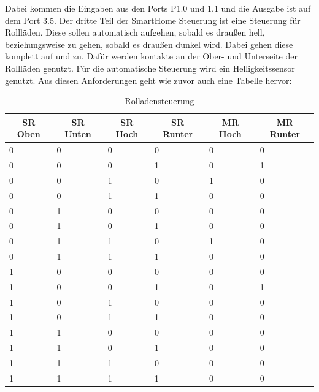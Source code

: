 Dabei kommen die Eingaben aus den Ports P1.0 und 1.1 und die Ausgabe ist auf dem Port 3.5.
Der dritte Teil der SmartHome Steuerung ist eine Steuerung für Rollläden. Diese sollen automatisch aufgehen, sobald es draußen hell, beziehungsweise zu gehen, sobald es draußen dunkel wird. Dabei gehen diese komplett auf und zu. Dafür werden kontakte an der Ober- und Unterseite der Rollläden genutzt. Für die automatische Steuerung wird ein Helligkeitssensor genutzt.
Aus diesen Anforderungen geht wie zuvor auch eine Tabelle hervor:

\begin{table}[]
\centering
\caption{Rolladensteuerung}
\label{my-label}
\begin{tabular}{|l|l|l|l|l|l|}
\hline
\multicolumn{1}{|c|}{\textbf{SR Oben}} & \multicolumn{1}{c|}{\textbf{SR Unten}} & \multicolumn{1}{c|}{\textbf{SR Hoch}} & \multicolumn{1}{c|}{\textbf{SR Runter}} & \multicolumn{1}{c|}{\textbf{MR Hoch}} & \multicolumn{1}{c|}{\textbf{MR Runter}} \\ \hline
 0 & 0 & 0 & 0 & 0 & 0 \\ \hline
 0 & 0 & 0 & 1 & 0 & 1 \\ \hline
 0 & 0 & 1 & 0 & 1 & 0 \\ \hline
 0 & 0 & 1 & 1 & 0 & 0 \\ \hline
 0 & 1 & 0 & 0 & 0 & 0 \\ \hline
 0 & 1 & 0 & 1 & 0 & 0 \\ \hline
 0 & 1 & 1 & 0 & 1 & 0 \\ \hline
 0 & 1 & 1 & 1 & 0 & 0 \\ \hline
 1 & 0 & 0 & 0 & 0 & 0 \\ \hline
 1 & 0 & 0 & 1 & 0 & 1 \\ \hline
 1 & 0 & 1 & 0 & 0 & 0 \\ \hline
 1 & 0 & 1 & 1 & 0 & 0 \\ \hline
 1 & 1 & 0 & 0 & 0 & 0 \\ \hline
 1 & 1 & 0 & 1 & 0 & 0 \\ \hline
 1 & 1 & 1 & 0 & 0 & 0 \\ \hline
 1 & 1 & 1 & 1 & 0 & 0 \\ \hline
\end{tabular}
\end{table}
